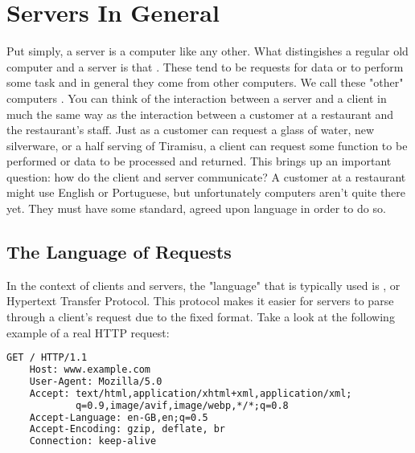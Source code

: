 \section{Servers In General}

Put simply, a server is a computer like any other. What distingishes a regular old computer and a server is that . These tend to be requests for data or to perform some task and in general they come from other computers. We call these "other" computers . You can think of the interaction between a server and a client in much the same way as the interaction between a customer at a restaurant and the restaurant's staff. Just as a customer can request a glass of water, new silverware, or a half serving of Tiramisu, a client can request some function to be performed or data to be processed and returned. This brings up an important question: how do the client and server communicate? A customer at a restaurant might use English or Portuguese, but unfortunately computers aren't quite there yet. They must have some standard, agreed upon language in order to do so.

\subsection*{The Language of Requests}

In the context of clients and servers, the "language" that is typically used is , or Hypertext Transfer Protocol. This protocol makes it easier for servers to parse through a client's request due to the fixed format. Take a look at the following example of a real HTTP request:

\begin{lstlisting}[language=html]
    GET / HTTP/1.1
    Host: www.example.com
    User-Agent: Mozilla/5.0
    Accept: text/html,application/xhtml+xml,application/xml;
            q=0.9,image/avif,image/webp,*/*;q=0.8
    Accept-Language: en-GB,en;q=0.5
    Accept-Encoding: gzip, deflate, br
    Connection: keep-alive
\end{lstlisting}

